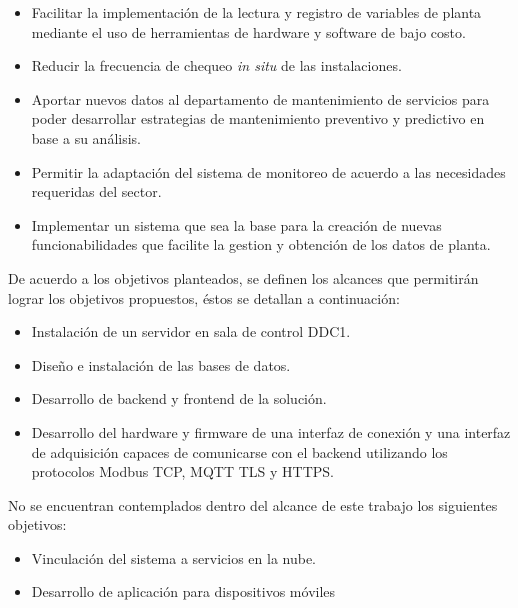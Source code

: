 \begin{itemize}
	\item Facilitar la implementación de la lectura y registro de variables de planta mediante el uso de herramientas de hardware y software de bajo costo. 
	\item Reducir la frecuencia de chequeo \textit{in situ} de las instalaciones.
	\item Aportar nuevos datos al departamento de mantenimiento de servicios para poder desarrollar estrategias de mantenimiento preventivo y predictivo en base a su análisis.
	\item Permitir la adaptación del sistema de monitoreo de acuerdo a las necesidades requeridas del sector.
	\item Implementar un sistema que sea la base para la creación de nuevas funcionabilidades que facilite la gestion y obtención de los datos de planta. \\ 
\end{itemize}

De acuerdo a los objetivos planteados, se definen los alcances que permitirán lograr los objetivos propuestos, éstos se detallan a continuación:\\ 

\begin{itemize}
 
	\item Instalación de un servidor en sala de control DDC1.
	\item Diseño e instalación de las bases de datos.
	\item Desarrollo de backend y frontend de la solución.
	\item Desarrollo del hardware y firmware de una interfaz de conexión y una interfaz de adquisición capaces de comunicarse con el backend utilizando los protocolos Modbus TCP, MQTT TLS y HTTPS.\\ 
	
\end{itemize}

No se encuentran contemplados dentro del alcance de este trabajo los siguientes objetivos:\\ 

\begin{itemize}
	\item Vinculación del sistema a servicios en la nube.
	\item Desarrollo de aplicación para dispositivos móviles
\end{itemize}


